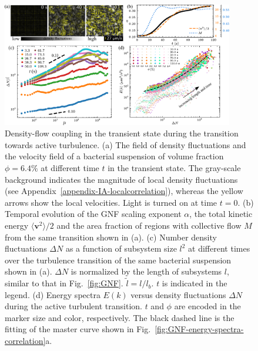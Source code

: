 \documentclass[twocolumn,aps,prx,amsmath,amssymb,longbibliography,superscriptaddress]{revtex4-2}
\begin{document}
\begin{figure}[t]
\begin{center}
\includegraphics[width=0.9\textwidth]{Figures/fig-6.pdf}
\caption[The correlation between GNF and kinetic energy and kinetic energy spectra at transient state]
{
Density-flow coupling in the transient state during the transition towards active turbulence.
(a) The field of density fluctuations and the velocity field of a bacterial suspension of volume fraction $\phi=6.4\%$ at different time $t$ in the transient state. The gray-scale background indicates the magnitude of local density fluctuations (see Appendix~\ref{appendix-IA-localcorrelation}), whereas the yellow arrows show the local velocities. Light is turned on at time $t = 0$.
(b) Temporal evolution of the GNF scaling exponent $\alpha$, the total kinetic energy $\langle \bm{v}^2 \rangle/2$ and the area fraction of regions with collective flow $M$ from the same transition shown in (a).
(c) Number density fluctuations $\Delta N$ as a function of subsystem size $l^2$ at different times over the turbulence transition of the same bacterial suspension shown in (a). $\Delta N$ is normalized by the length of subsystems $l$, similar to that in Fig.~\ref{fig:GNF}. $\tilde{l} = l/l_b$. $t$ is indicated in the legend.
(d) Energy spectra $E(k)$ versus density fluctuations $\Delta N$ during the active turbulent transition. $t$ and $\phi$ are encoded in the marker size and color, respectively. The black dashed line is the fitting of the master curve shown in Fig.~\ref{fig:GNF-energy-spectra-correlation}a.
}
\label{fig:GNF-energy-spectra-correlation-transient}
\end{center}
\end{figure}
\end{document}

